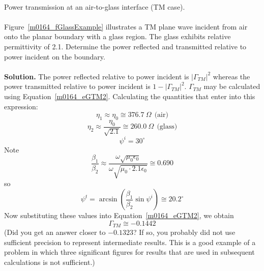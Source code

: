 ~\\ \begin{example} 
\begin{mdframed}[backgroundcolor=brown!20,linecolor=brown!20]\raggedright
Power transmission at an air-to-glass interface (TM case).
\\~\\
Figure~\ref{m0164_fGlassExample} illustrates a TM plane wave incident from air onto the planar boundary with a glass region.
The glass exhibits relative permittivity of 2.1.  
Determine the power reflected and transmitted relative to power incident on the boundary.\\
~\\

\noindent
{\bf Solution.}
The power reflected relative to power incident is $\left|\Gamma_{TM}\right|^2$ whereas
the power transmitted relative to power incident is $1-\left|\Gamma_{TM}\right|^2$.
$\Gamma_{TM}$ may be calculated using Equation~\ref{m0164_eGTM2}.
Calculating the quantities that enter into this expression:
%
\begin{equation} 
\eta_1 \approx \eta_0 \cong 376.7~\Omega ~~ \mbox{(air)} 
\end{equation}
%
\begin{equation} 
\eta_2 \approx \frac{\eta_0}{\sqrt{2.1}} \cong 260.0~\Omega ~~ \mbox{(glass)}
\end{equation}
%
\begin{equation} 
\psi^i = 30^{\circ} 
\end{equation}
Note
%
\begin{equation} 
\frac{\beta_1}{\beta_2} \approx \frac{\omega\sqrt{\mu_0\epsilon_0}}{\omega\sqrt{\mu_0\cdot2.1\epsilon_0}} \cong 0.690 
\end{equation}
so
%
\begin{equation} 
\psi^t = \arcsin\left(\frac{\beta_1}{\beta_2}\sin\psi^i\right) \cong 20.2^{\circ} 
\end{equation}
%
Now substituting these values into Equation~\ref{m0164_eGTM2}, we obtain
%
\begin{equation} 
\Gamma_{TM} \cong -0.1442 
\end{equation}
(Did you get an answer closer to $-0.1323$? If so, you probably did not use sufficient precision to represent intermediate results.  This is a good example of a problem in which three significant figures for results that are used in subsequent calculations is not sufficient.)


\end{mdframed}
\end{example}

